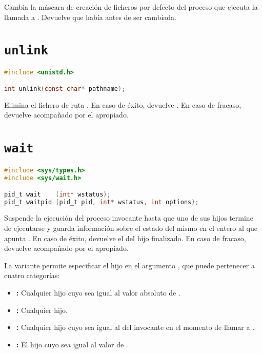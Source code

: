 Cambia la máscara de creación de ficheros por defecto del proceso que ejecuta la llamada a .
Devuelve que había antes de ser cambiada.

\pagebreak

\section{\texttt{unlink}}\label{unlink}

\begin{lstlisting}[language=C]
#include <unistd.h>

int unlink(const char* pathname);
\end{lstlisting}

Elimina el fichero de ruta .
En caso de éxito, devuelve .
En caso de fracaso, devuelve  acompañado por el  apropiado.

\section{\texttt{wait}}\label{wait}

\begin{lstlisting}[language=C]
#include <sys/types.h>
#include <sys/wait.h>

pid_t wait    (int* wstatus);
pid_t waitpid (pid_t pid, int* wstatus, int options);
\end{lstlisting}

Suspende la ejecución del proceso invocante hasta que uno de sus hijos termine de ejecutarse y guarda información sobre el estado del mismo en el entero al que apunta .
En caso de éxito, devuelve el  del hijo finalizado.
En caso de fracaso, devuelve  acompañado por el  apropiado.

La variante  permite especificar el hijo en el argumento , que puede pertenecer a cuatro categorías:

\begin{itemize}
	\item{}\textbf{:} Cualquier hijo cuyo  sea igual al valor absoluto de .
	\item{}\textbf{:} Cualquier hijo.
	\item{}\textbf{:} Cualquier hijo cuyo  sea igual al del invocante en el momento de llamar a .
	\item{}\textbf{:} El hijo cuyo  sea igual al valor de .
\end{itemize}

